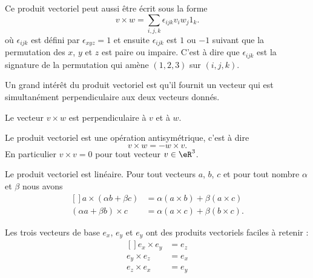 Ce produit vectoriel peut aussi être écrit sous la forme
\begin{equation}        \label{EqProdVectEspilonijk}
    v\times w=\sum_{i,j,k}\epsilon_{ijk}v_iw_j1_k.
\end{equation}
où $\epsilon_{ijk}$ est défini par $\epsilon_{xyz}=1$ et ensuite $\epsilon_{ijk}$ est $1$ ou $-1$ suivant que la permutation des $x$, $y$ et $z$ est paire ou impaire. C'est à dire que \( \epsilon_{ijk}\) est la signature de la permutation qui amène \( (1,2,3)\) sur \( (i,j,k)\).

Un grand intérêt du produit vectoriel est qu'il fournit un vecteur qui est simultanément perpendiculaire aux deux vecteurs donnés.
\begin{proposition}
    Le vecteur $v\times w$ est perpendiculaire à $v$ et à $w$.
\end{proposition}

\begin{proposition}
    Le produit vectoriel est une opération antisymétrique, c'est à dire
    \begin{equation}
        v\times w=-w\times v.
    \end{equation}
    En particulier $v\times v=0$ pour tout vecteur $v\in\eR^3$.
\end{proposition}

\begin{proposition}
    Le produit vectoriel est linéaire. Pour tout vecteurs $a$, $b$, $c$ et pour tout nombre $\alpha$ et $\beta$ nous avons
    \begin{equation}
        \begin{aligned}[]
            a\times (\alpha b +\beta c)&=\alpha(a\times b)+\beta(a\times c)\\
            (\alpha a+\beta b)\times c&=\alpha(a\times c)+\beta(b\times c).
        \end{aligned}
    \end{equation}
\end{proposition}

Les trois vecteurs de base $e_x$, $e_y$ et $e_y$ ont des produits vectoriels faciles à retenir :
\begin{equation}
    \begin{aligned}[]
        e_x\times e_y&=e_z\\
        e_y\times e_z&=e_x\\
        e_z\times e_x&=e_y
    \end{aligned}
\end{equation}

